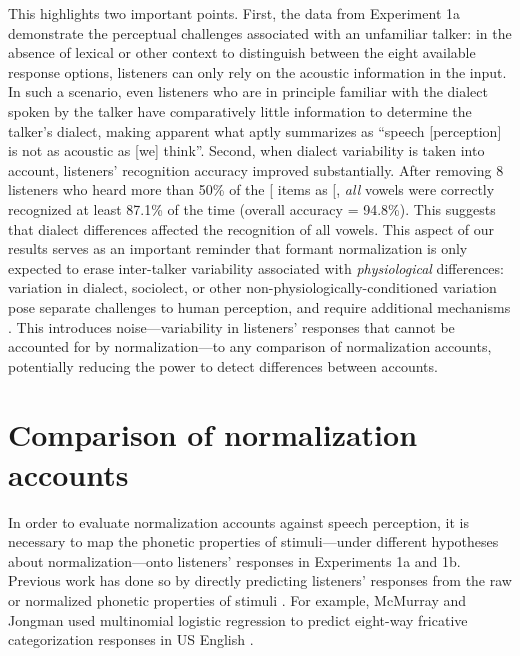 \documentclass[preprint]{JASA}
\begin{document}
This highlights two important points. First, the data from Experiment 1a demonstrate the perceptual challenges associated with an unfamiliar talker: in the absence of lexical or other context to distinguish between the eight available response options, listeners can only rely on the acoustic information in the input. In such a scenario, even listeners who are in principle familiar with the dialect spoken by the talker have comparatively little information to determine the talker's dialect, making apparent what \citet{winn2018} aptly summarizes as ``speech {[}perception{]} is not as acoustic as {[}we{]} think''. Second, when dialect variability is taken into account, listeners' recognition accuracy improved substantially. After removing 8 listeners who heard more than 50\% of the {[}\ipatext{ɪ}{]} items as {[}\ipatext{ɛ}{]}, \emph{all} vowels were correctly recognized at least 87.1\% of the time (overall accuracy = 94.8\%). This suggests that dialect differences affected the recognition of all vowels. This aspect of our results serves as an important reminder that formant normalization is only expected to erase inter-talker variability associated with \emph{physiological} differences: variation in dialect, sociolect, or other non-physiologically-conditioned variation pose separate challenges to human perception, and require additional mechanisms \citep[see discussion in][]{barreda2021, weatherholtz-jaeger2016}. This introduces noise---variability in listeners' responses that cannot be accounted for by normalization---to any comparison of normalization accounts, potentially reducing the power to detect differences between accounts.

\section{Comparison of normalization accounts}\label{comparison-of-normalization-accounts}

In order to evaluate normalization accounts against speech perception, it is necessary to map the phonetic properties of stimuli---under different hypotheses about normalization---onto listeners' responses in Experiments 1a and 1b. Previous work has done so by directly predicting listeners' responses from the raw or normalized phonetic properties of stimuli \citep{apfelbaum-mcmurray2015, barreda2021, crinnion2020, mcmurray-jongman2011, nearey1989}. For example, McMurray and Jongman used multinomial logistic regression to predict eight-way fricative categorization responses in US English \citep[see also][]{barreda2021}.
\end{document}
